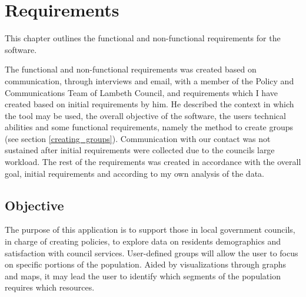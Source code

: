 \chapter{Requirements} \label{ch:requirements}

This chapter outlines the functional and non-functional requirements for the software.\par

The functional and non-functional requirements was created based on communication, through interviews and email, with a member of the Policy and Communications Team of Lambeth Council, and requirements which I have created based on initial requirements by him. He described the context in which the tool may be used, the overall objective of the software, the users\textsc{} technical abilities and some functional requirements, namely the method to create groups (see section \ref{creating_groups}). Communication with our contact was not sustained after initial requirements were collected due to the council\textquotesingle s large workload. The rest of the requirements was created in accordance with the overall goal, initial requirements and according to my own analysis of the data.

\section{Objective}
The purpose of this application is to support those in local government councils, in charge of creating policies, to explore data on residents demographics and satisfaction with council services. User-defined groups will allow the user to focus on specific portions of the population. Aided by visualizations through graphs and maps, it may lead the user to identify which segments of the population requires which resources.

